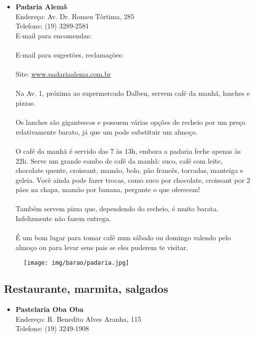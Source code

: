 \begin{itemize}
\item \textbf{Padaria Alemã}
  \\Endereço: Av. Dr. Romeu Tórtima, 285
  \\Telefone: (19) 3289-2581
  \\E-mail para encomendas:\\
  \\E-mail para sugestões, reclamações:\\
  \\Site: \url{www.padariaalema.com.br}
  \\
  \\Na Av. 1, próxima ao supermercado Dalben, servem café da manhã, lanches e
  pizzas.
  \\
  \\Os lanches são gigantescos e possuem várias opções de recheio por um preço
  relativamente barato, já que um pode substituir um almoço.
  \\
  \\O café da manhã é servido das 7 às 13h, embora a padaria feche apenas às
  22h. Serve um grande combo de café da manhã: suco, café com leite, chocolate
  quente, croissant, mamão, bolo, pão francês, torradas, manteiga e geleia.
  Você ainda pode fazer trocas, como suco por chocolate, croissant por 2 pães
  na chapa, mamão por banana, pergunte o que oferecem!
  \\
  \\Também servem pizza que, dependendo do recheio, é muito barata.
  Infelizmente não fazem entrega.
  \\
  \\É um bom lugar para tomar café num sábado ou domingo valendo pelo almoço ou
  para levar seus pais se eles puderem te visitar.
\end{itemize}

\begin{figure}[h!]
  \centering
  \texttt{[image: img/barao/padaria.jpg]}
\end{figure}

\subsection{Restaurante, marmita, salgados}

\begin{itemize}
\item \textbf{Pastelaria Oba Oba}
  \\Endereço: R. Benedito Alves Aranha, 115
  \\Telefone: (19) 3249-1908
\end{itemize}

